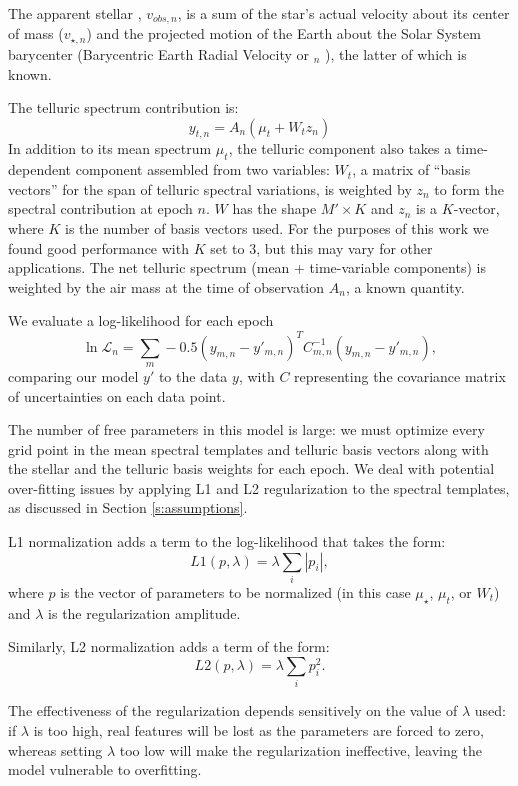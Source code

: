 \documentclass[modern]{aastex62}
\begin{document}
The apparent stellar \RV, $v_{obs, n}$, is a sum of the star's actual velocity about its center of mass ($v_{\star, n}$) and the projected motion of the Earth about the Solar System barycenter (Barycentric Earth Radial Velocity or \BERV$_{n}$ ), the latter of which is known.

The telluric spectrum contribution is:
\begin{equation}
y_{t, n} =  A_n(\mu_{t} + W_{t} z_n)
\end{equation}
In addition to its mean spectrum $\mu_t$, the telluric component also takes a time-dependent component assembled from two variables: $W_t$, a matrix of ``basis vectors'' for the span of telluric spectral variations, is weighted by $z_n$ to form the spectral contribution at epoch $n$. 
$W$ has the shape $M' \times K$ and $z_n$ is a $K$-vector, where $K$ is the number of basis vectors used. 
For the purposes of this work we found good performance with $K$ set to 3, but this may vary for other applications. 
The net telluric spectrum (mean + time-variable components) is weighted by the air mass at the time of observation $A_n$, a known quantity.

We evaluate a log-likelihood for each epoch
\begin{equation}
\ln \mathcal{L}_n = \sum_{m} -0.5 (y_{m,n} - y'_{m,n})^T C_{m,n}^{-1} (y_{m,n}-y'_{m,n}),
\end{equation}
comparing our model $y'$ to the data $y$, with $C$ representing the covariance matrix of uncertainties on each data point.

The number of free parameters in this model is large: we must optimize every grid point in the mean spectral templates and telluric basis vectors along with the stellar \RV and the telluric basis weights for each epoch. 
We deal with potential over-fitting issues by applying L1 and L2 regularization to the spectral templates, as discussed in Section \ref{s:assumptions}. 

L1 normalization adds a term to the log-likelihood that takes the form:
$$ L1(p, \lambda) = \lambda \sum_{i} | p_{i} | ,$$
where $p$ is the vector of parameters to be normalized (in this case $\mu_{{\star}}$, $\mu_{{t}}$, or $W_{t}$) and $\lambda$ is the regularization amplitude.

Similarly, L2 normalization adds a term of the form:
$$ L2(p, \lambda) = \lambda \sum_{i} p_{i}^2 .$$

The effectiveness of the regularization depends sensitively on the value of $\lambda$ used: if $\lambda$ is too high, real features will be lost as the parameters are forced to zero, whereas setting $\lambda$ too low will make the regularization ineffective, leaving the model vulnerable to overfitting. 
\end{document}
